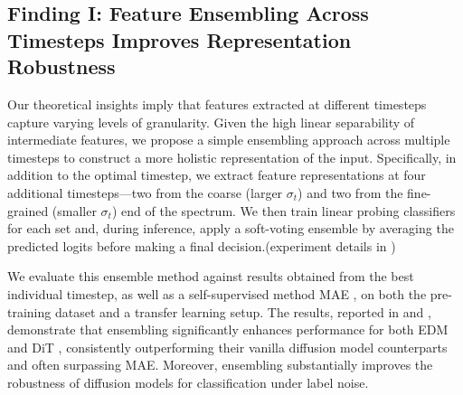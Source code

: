 
\subsection{Finding I: Feature Ensembling Across Timesteps Improves Representation Robustness}\label{subsec:exp_ensemeble}

Our theoretical insights imply that features extracted at different timesteps capture varying levels of granularity. Given the high linear separability of intermediate features, we propose a simple ensembling approach across multiple timesteps to construct a more holistic representation of the input. Specifically, in addition to the optimal timestep, we extract feature representations at four additional timesteps—two from the coarse (larger $\sigma_t$) and two from the fine-grained (smaller $\sigma_t$) end of the spectrum. We then train linear probing classifiers for each set and, during inference, apply a soft-voting ensemble by averaging the predicted logits before making a final decision.(experiment details in )

We evaluate this ensemble method against results obtained from the best individual timestep, as well as a self-supervised method MAE \citep{he2022masked}, on both the pre-training dataset and a transfer learning setup. The results, reported in  and , demonstrate that ensembling significantly enhances performance for both EDM \citep{karras2022elucidating} and DiT \citep{peebles2023scalable}, consistently outperforming their vanilla diffusion model counterparts and often surpassing MAE. Moreover, ensembling substantially improves the robustness of diffusion models for classification under label noise.

